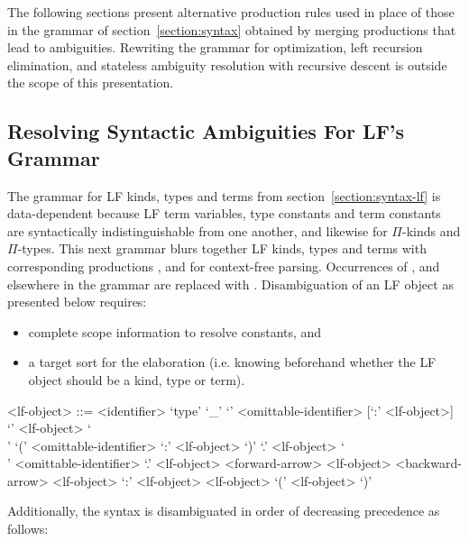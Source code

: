 The following sections present alternative production rules used in place of those in the grammar of section~\ref{section:syntax} obtained by merging productions that lead to ambiguities.
Rewriting the grammar for optimization, left recursion elimination, and stateless ambiguity resolution with recursive descent is outside the scope of this presentation.

\subsection{Resolving Syntactic Ambiguities For \acs{LF}'s Grammar}

The grammar for \ac{LF} kinds, types and terms from section~\ref{section:syntax-lf} is data-dependent because \ac{LF} term variables, type constants and term constants are syntactically indistinguishable from one another, and likewise for $ \Pi $-kinds and $ \Pi $-types.
This next grammar blurs together \ac{LF} kinds, types and terms with corresponding productions ,  and  for context-free parsing.
Occurrences of ,  and  elsewhere in the grammar are replaced with .
Disambiguation of an \ac{LF} object as presented below requires:
\begin{itemize}
\item complete scope information to resolve constants, and
\item a target sort for the elaboration (i.e. knowing beforehand whether the \ac{LF} object should be a kind, type or term).
\end{itemize}

\begin{grammar}
<lf-object> ::= <identifier>
\alt `type'
\alt `_'
\alt `{' <omittable-identifier> [`:' <lf-object>] `}' <lf-object>
\alt `\\' `(' <omittable-identifier> `:' <lf-object> `)' `.' <lf-object>
\alt `\\' <omittable-identifier> `.' <lf-object>
 <forward-arrow> <lf-object>
 <backward-arrow> <lf-object>
 `:' <lf-object>
 <lf-object>
\alt `(' <lf-object> `)'
\end{grammar}

Additionally, the syntax is disambiguated in order of decreasing precedence as follows:

